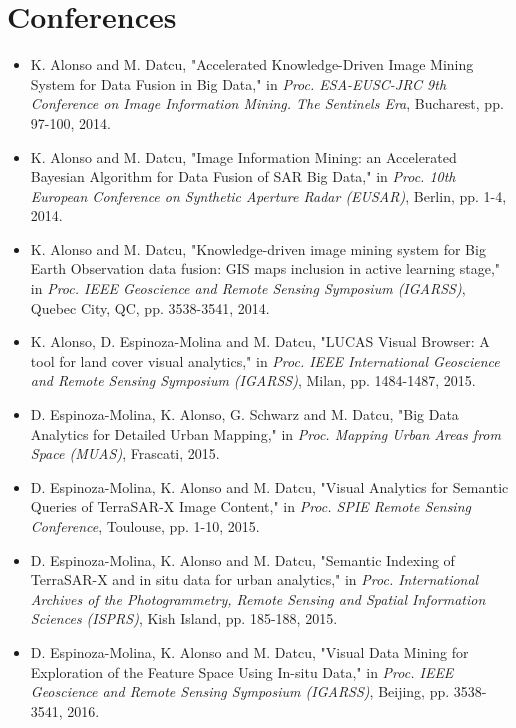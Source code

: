 \section{Conferences}
\begin{itemize}
\item
K. Alonso and M. Datcu, "Accelerated Knowledge-Driven Image Mining System for Data Fusion in Big Data," in \textit{Proc. ESA-EUSC-JRC 9th Conference on Image Information Mining. The Sentinels Era}, Bucharest, pp. 97-100, 2014. %

\item
K. Alonso and M. Datcu, "Image Information Mining: an Accelerated Bayesian Algorithm for Data Fusion of SAR Big Data," in\textit{ Proc. 10th European Conference on Synthetic Aperture Radar (EUSAR)}, Berlin, pp. 1-4, 2014.

\item
K. Alonso and M. Datcu, "Knowledge-driven image mining system for Big Earth Observation data fusion: GIS maps inclusion in active learning stage," in \textit{Proc. IEEE Geoscience and Remote Sensing Symposium (IGARSS)}, Quebec City, QC, pp. 3538-3541, 2014.

\item
K. Alonso, D. Espinoza-Molina and M. Datcu, "LUCAS Visual Browser: A tool for land cover visual analytics," in \textit{Proc. IEEE International Geoscience and Remote Sensing Symposium (IGARSS)}, Milan, pp. 1484-1487, 2015.

\item
D. Espinoza-Molina, K. Alonso, G. Schwarz and M. Datcu, "Big Data Analytics for Detailed Urban Mapping," in \textit{Proc. Mapping Urban Areas from Space (MUAS)}, Frascati, 2015. 

\item
D. Espinoza-Molina, K. Alonso and M. Datcu, "Visual Analytics for Semantic Queries of TerraSAR-X Image Content," in \textit{Proc. SPIE Remote Sensing Conference}, Toulouse, pp. 1-10, 2015.

\item
D. Espinoza-Molina, K. Alonso and M. Datcu, "Semantic Indexing of TerraSAR-X and in situ data for urban analytics," in \textit{Proc. International Archives of the Photogrammetry, Remote Sensing and Spatial Information Sciences (ISPRS)}, Kish Island, pp. 185-188, 2015.

\item
D. Espinoza-Molina, K. Alonso and M. Datcu, "Visual Data Mining for Exploration of the Feature Space Using In-situ Data," in \textit{Proc. IEEE Geoscience and Remote Sensing Symposium (IGARSS)}, Beijing, pp. 3538-3541, 2016.
\end{itemize}
